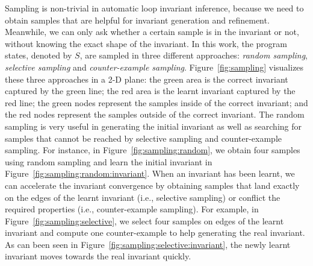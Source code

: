 Sampling is non-trivial in automatic loop invariant inference, 
because we need to obtain samples that are helpful for invariant generation and refinement. 
Meanwhile, we can only ask whether a certain sample is in the invariant or not, 
without knowing the exact shape of the invariant. 
In this work, the program states, denoted by $S$, are sampled in three different approaches: 
\emph{random sampling}, \emph{selective sampling} and \emph{counter-example sampling}. 
Figure~\ref{fig:sampling} visualizes these three approaches in a 2-D plane: 
the green area is the correct invariant captured by the green line; 
the red area is the learnt invariant captured by the red line; 
the green nodes represent the samples inside of the correct invariant; 
and the red nodes represent the samples outside of the correct invariant. 
The random sampling is very useful in generating the initial invariant 
as well as searching for samples that cannot be reached 
by selective sampling and counter-example sampling. 
For instance, in Figure~\ref{fig:sampling:random}, 
we obtain four samples using random sampling 
and learn the initial invariant in Figure~\ref{fig:sampling:random:invariant}. 
When an invariant has been learnt, 
we can accelerate the invariant convergence by obtaining samples that 
land exactly on the edges of the learnt invariant (i.e., selective sampling) 
or conflict the required properties (i.e., counter-example sampling). 
For example, in Figure~\ref{fig:sampling:selective}, 
we select four samples on edges of the learnt invariant and 
compute one counter-example to help generating the real invariant. 
As can been seen in Figure~\ref{fig:sampling:selective:invariant}, 
the newly learnt invariant moves towards the real invariant quickly. 

